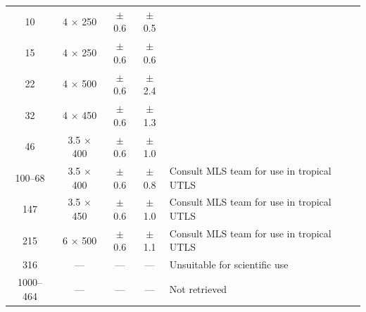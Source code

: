 \begin{table}
\begin{minipage}{\linewidth}
\begin{tabular}{ccccl}
%
10      & 4 $\times$ 250     & $\pm$0.6  & $\pm$0.5 & \\
%
15      & 4 $\times$ 250     & $\pm$0.6  & $\pm$0.6 & \\
%
22      & 4 $\times$ 500     & $\pm$0.6  & $\pm$2.4 & \\
%
32      & 4 $\times$ 450     & $\pm$0.6  & $\pm$1.3 & \\
%
46      & 3.5 $\times$ 400   & $\pm$0.6  & $\pm$1.0 & \\
%
100--68 & 3.5 $\times$ 400   &  $\pm$0.6 & $\pm$0.8 & Consult MLS team for use in tropical UTLS\\
%
147     & 3.5 $\times$ 450   & $\pm$0.6  & $\pm$1.0 & Consult MLS team for use in tropical UTLS\\
%
215     & 6 $\times$ 500     & $\pm$0.6  & $\pm$1.1 &  Consult MLS team for use in tropical UTLS\\
%
316     & ---         & ---    & ---    & Unsuitable for scientific use\\
%
1000--464  & ---      & ---    & ---    & Not retrieved\\
%
\bottomrule
\end{tabular}\par
    \end{minipage}
  \end{table}

